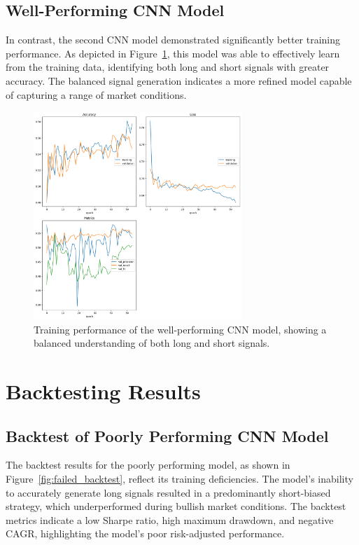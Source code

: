 \subsection{Well-Performing CNN Model}

In contrast, the second CNN model demonstrated significantly better training performance. As depicted in Figure~\ref{fig:good_model_training}, this model was able to effectively learn from the training data, identifying both long and short signals with greater accuracy. The balanced signal generation indicates a more refined model capable of capturing a range of market conditions.

\begin{figure}[h!]
    \centering
    \includegraphics[width=0.7\textwidth]{chapters/Chap3/CNN_Working_Training.png}
    \caption{Training performance of the well-performing CNN model, showing a balanced understanding of both long and short signals.}
    \label{fig:good_model_training}
\end{figure}

\section{Backtesting Results}

\subsection{Backtest of Poorly Performing CNN Model}

The backtest results for the poorly performing model, as shown in Figure~\ref{fig:failed_backtest}, reflect its training deficiencies. The model’s inability to accurately generate long signals resulted in a predominantly short-biased strategy, which underperformed during bullish market conditions. The backtest metrics indicate a low Sharpe ratio, high maximum drawdown, and negative CAGR, highlighting the model's poor risk-adjusted performance.

